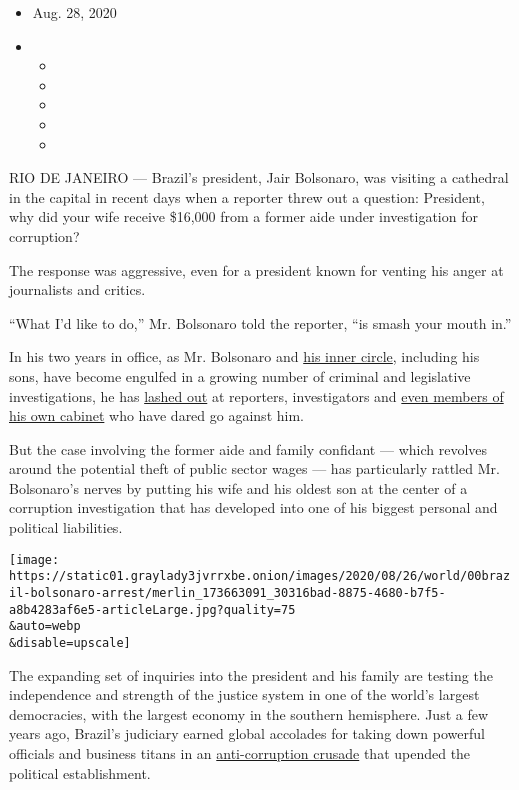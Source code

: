 \begin{itemize}
\item
  Aug. 28, 2020
\item
  \begin{itemize}
  \item
  \item
  \item
  \item
  \item
  \end{itemize}
\end{itemize}

RIO DE JANEIRO --- Brazil's president, Jair Bolsonaro, was visiting a
cathedral in the capital in recent days when a reporter threw out a
question: President, why did your wife receive \$16,000 from a former
aide under investigation for corruption?

The response was aggressive, even for a president known for venting his
anger at journalists and critics.

``What I'd like to do,'' Mr. Bolsonaro told the reporter, ``is smash
your mouth in.''

In his two years in office, as Mr. Bolsonaro and
\href{https://www.nytimes3xbfgragh.onion/2019/02/01/world/americas/brazil-flavio-bolsonaro.html}{his
inner circle}, including his sons, have become engulfed in a growing
number of criminal and legislative investigations, he has
\href{https://www.nytimes3xbfgragh.onion/2020/05/29/world/americas/brazil-bolsonaro-supreme-court.html}{lashed
out} at reporters, investigators and
\href{https://www.nytimes3xbfgragh.onion/2020/04/24/world/americas/brazil-bolsonaro-moro.html}{even
members of his own cabinet} who have dared go against him.

But the case involving the former aide and family confidant --- which
revolves around the potential theft of public sector wages --- has
particularly rattled Mr. Bolsonaro's nerves by putting his wife and his
oldest son at the center of a corruption investigation that has
developed into one of his biggest personal and political liabilities.

\texttt{[image: https://static01.graylady3jvrrxbe.onion/images/2020/08/26/world/00brazil-bolsonaro-arrest/merlin\_173663091\_30316bad-8875-4680-b7f5-a8b4283af6e5-articleLarge.jpg?quality=75\\\&auto=webp\\\&disable=upscale]}

The expanding set of inquiries into the president and his family are
testing the independence and strength of the justice system in one of
the world's largest democracies, with the largest economy in the
southern hemisphere. Just a few years ago, Brazil's judiciary earned
global accolades for taking down powerful officials and business titans
in an
\href{https://www.nytimes3xbfgragh.onion/2016/06/11/world/americas/brazil-corruption-dilma-rousseff-operation-car-wash.html}{anti-corruption
crusade} that upended the political establishment.

